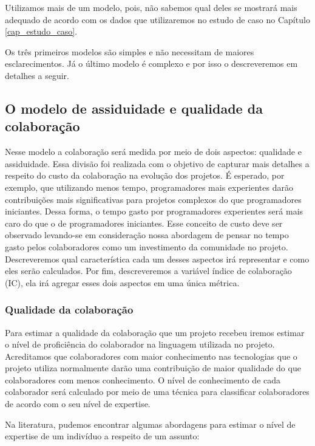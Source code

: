 Utilizamos mais de um modelo, pois, não sabemos qual deles se mostrará mais adequado de acordo com os dados que utilizaremos no estudo de caso no Capítulo \ref{cap_estudo_caso}.

Os três primeiros modelos são simples e não necessitam de maiores esclarecimentos. Já o último modelo é complexo e por isso o descreveremos em detalhes a seguir. 


\subsection{O modelo de assiduidade e qualidade da colaboração}

Nesse modelo a colaboração será medida por meio de dois aspectos:  qualidade e assiduidade. Essa divisão foi realizada com o objetivo de capturar mais detalhes a respeito do custo da colaboração na evolução dos projetos.  É esperado, por exemplo, que utilizando menos tempo, programadores mais experientes darão contribuições mais significativas para projetos complexos do que programadores iniciantes. Dessa forma, o tempo gasto por programadores experientes será mais caro do que o de programadores iniciantes. Esse conceito de custo deve ser observado levando-se em consideração nossa abordagem de pensar no tempo gasto pelos colaboradores como um investimento da comunidade no projeto.  Descreveremos qual  característica cada um desses aspectos irá representar e como eles serão calculados. Por fim, descreveremos a variável índice de colaboração (IC), ela irá agregar esses dois aspectos em uma única métrica.

\subsubsection{Qualidade da colaboração}
\label{cap_modelo_colaboracao_concreto}

Para estimar a qualidade da colaboração que um projeto recebeu iremos estimar o  nível de proficiência do colaborador na linguagem utilizada no projeto. Acreditamos que colaboradores com maior conhecimento nas tecnologias que o projeto utiliza normalmente darão uma contribuição de maior qualidade do que colaboradores com menos conhecimento. O nível de conhecimento de cada colaborador será calculado por meio de uma técnica para classificar colaboradores de acordo com o seu nível de expertise. 

Na literatura, pudemos encontrar algumas abordagens para estimar o nível de expertise de um indivíduo a respeito de um assunto:  

